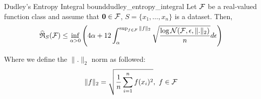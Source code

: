 \begin{theorem}{Dudley's Entropy Integral bound}{dudley_entropy_integral}
    Let $\mathcal{F}$ be a real-valued function class and assume that ${\bf 0}\in\mathcal{F}$, $S=\{x_1, \dots, x_n\}$ is a dataset. Then,
    \begin{align*}
        \widehat{\mathfrak{R}}_S(\mathcal{F}) \le \inf_{\alpha>0} \Bigg( 
            4\alpha + 12\int_\alpha^{\sup_{f\in\mathcal{F}}\|f\|_2} \sqrt{
                \frac{\log\mathcal{N}(\mathcal{F}, \epsilon,\|.\|_2)}{n}
            }d\epsilon
         \Bigg)
    \end{align*}

    \noindent Where we define the $\|.\|_2$ norm as followed:
    \begin{align*}
        \|f\|_2 = \sqrt{
            \frac{1}{n}\sum_{i=1}^n f(x_i)^2
        }, \ f\in\mathcal{F}
    \end{align*}
\end{theorem}
